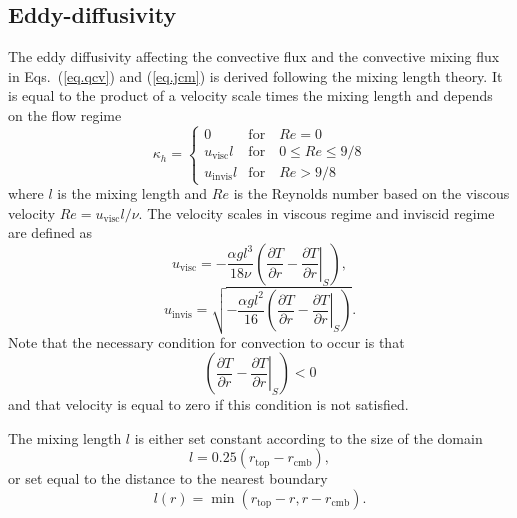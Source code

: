 \documentclass{article}
\begin{document}
\subsection{Eddy-diffusivity}
The eddy diffusivity affecting the convective flux and the convective mixing flux in Eqs.~(\ref{eq.qcv}) and (\ref{eq.jcm}) is derived following the mixing length theory. It is equal to the product of a velocity scale times the mixing length and depends on the flow regime
\begin{equation}
\kappa_h =
\begin{cases}
    0 &\mathrm{for}\quad Re=0 \\
    u_\mathrm{visc}l &\mathrm{for}\quad 0\leq Re \leq 9/8\\
    u_\mathrm{invis}l &\mathrm{for}\quad Re > 9/8
\end{cases}
\end{equation}
where $l$ is the mixing length and $Re$ is the Reynolds number  based on the viscous velocity $Re = u_\mathrm{visc}l/\nu$. The velocity scales in viscous regime and inviscid regime are defined as
\begin{equation}
    u_\mathrm{visc} = -\frac{\alpha g l^3}{18\nu} \left( \frac{\partial T}{\partial r}-
    \left.\frac{\partial T}{\partial r}\right|_S\right),
\end{equation}
\begin{equation}
    u_\mathrm{invis} = \sqrt{-\frac{\alpha g l^2}{16}
\left( \frac{\partial T}{\partial r}-
    \left.\frac{\partial T}{\partial r}\right|_S\right)}.
\end{equation}
Note that the necessary condition for convection to occur is that
\begin{equation}
    \left( \frac{\partial T}{\partial r}-
    \left.\frac{\partial T}{\partial r}\right|_S\right) <0
\end{equation}
and that velocity is equal to zero if this condition is not satisfied.

The mixing length $l$ is either set constant according to the size of the domain
\begin{equation}
    l=0.25(r_\mathrm{top}-r_\mathrm{cmb}),
\end{equation}
or set equal to the distance to the nearest boundary
\begin{equation}
    l(r)=\min(r_\mathrm{top}-r, r-r_\mathrm{cmb}).
\end{equation}
\end{document}
